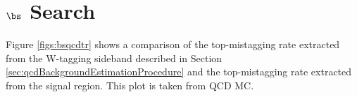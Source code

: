 




\section{$\bs$ Search}
\label{sec:appendix}
Figure \ref{figs:bsqcdtr} shows a comparison of the top-mistagging rate extracted from the W-tagging sideband described in Section \ref{sec:qcdBackgroundEstimationProcedure} and the top-mistagging rate extracted from the signal region.  
This plot is taken from QCD MC.

